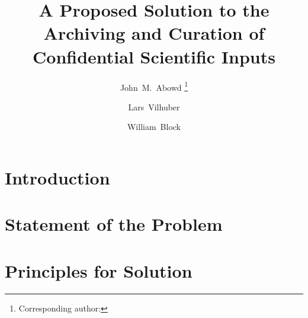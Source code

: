 \documentclass{llncs}
\begin{document}
%
\title{A Proposed Solution to the Archiving and Curation of Confidential Scientific Inputs}

\author{John~M.~Abowd%
\thanks{Corresponding author: }%
\and Lars~Vilhuber%
\and William~Block%
}

%


\maketitle

\begin{abstract}


\end{abstract}


%

%

\section{Introduction}



\section{Statement of the Problem}



\section{Principles for Solution}
\end{document}

